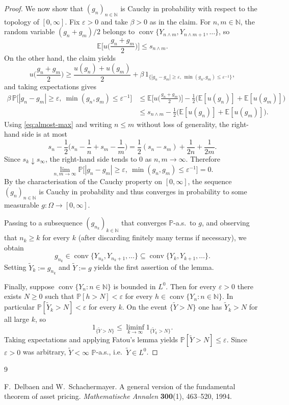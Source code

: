 \documentclass[11pt,a4paper]{report}
\numberwithin{equation}{chapter}
\theoremstyle{plain}
\theoremstyle{definition}
\newcommand{\E}{\mathbb{E}}
\newcommand{\PP}{\mathbb{P}}
\newcommand{\N}{\mathbb{N}}
\begin{document}
\begin{proof}
    We now show that $(g_n)_{n\in\N}$ is Cauchy in probability with respect to the topology of $[0,\infty]$. Fix $\varepsilon>0$ and take $\beta>0$ as in the claim. For $n,m\in\N$, the random variable $(g_n+g_m)/2$ belongs to $\operatorname{conv}\{Y_{n\wedge m},Y_{n\wedge m+1},\dots\}$, so
    \[
        \E\Big[u\Big(\frac{g_n+g_m}2\Big)\Big]\le s_{n\wedge m}.
    \]
    On the other hand, the claim yields
    \[
        u\Big(\frac{g_n+g_m}2\Big)\ge\frac{u(g_n)+u(g_m)}2+\beta\,1_{\{|g_n-g_m|\ge\varepsilon,\,\min(g_n,g_m)\le\varepsilon^{-1}\}},
    \]
    and taking expectations gives
    \begin{align*}
        \beta\,\PP\big[|g_n-g_m|\ge\varepsilon,\ \min(g_n,g_m)\le\varepsilon^{-1}\big]
         & \le\E\Big[u\Big(\frac{g_n+g_m}2\Big)\Big]-\frac12\big(\E[u(g_n)]+\E[u(g_m)]\big) \\
         & \le s_{n\wedge m}-\frac12\big(\E[u(g_n)]+\E[u(g_m)]\big).
    \end{align*}
    Using \eqref{eq:almost-max} and writing $n\le m$ without loss of generality, the right-hand side is at most
    \[
        s_n-\frac12\Big(s_n-\frac1n+s_m-\frac1m\Big)=\frac12(s_n-s_m)+\frac1{2n}+\frac1{2m}.
    \]
    Since $s_k\downarrow s_\infty$, the right-hand side tends to $0$ as $n,m\to\infty$. Therefore
    \[
        \lim_{n,m\to\infty}\PP\big[|g_n-g_m|\ge\varepsilon,\ \min(g_n,g_m)\le\varepsilon^{-1}\big]=0.
    \]
    By the characterisation of the Cauchy property on $[0,\infty]$, the sequence $(g_n)_{n\in\N}$ is Cauchy in probability and thus converges in probability to some measurable $g\colon\Omega\to[0,\infty]$.

    Passing to a subsequence $(g_{n_k})_{k\in\N}$ that converges $\PP$-a.s.\ to $g$, and observing that $n_k\ge k$ for every $k$ (after discarding finitely many terms if necessary), we obtain
    \[
        g_{n_k}\in\operatorname{conv}\{Y_{n_k},Y_{n_k+1},\dots\}\subseteq\operatorname{conv}\{Y_k,Y_{k+1},\dots\}.
    \]
    Setting $\widetilde Y_k:=g_{n_k}$ and $\widetilde Y:=g$ yields the first assertion of the lemma.

    Finally, suppose $\operatorname{conv}\{Y_n:n\in\N\}$ is bounded in $L^0$. Then for every $\varepsilon>0$ there exists $N\ge0$ such that $\PP[h>N]<\varepsilon$ for every $h\in\operatorname{conv}\{Y_n:n\in\N\}$. In particular $\PP[\widetilde Y_k>N]<\varepsilon$ for every $k$. On the event $\{\widetilde Y>N\}$ one has $\widetilde Y_k>N$ for all large $k$, so
    \[
        1_{\{\widetilde Y>N\}}\le\liminf_{k\to\infty}1_{\{\widetilde Y_k>N\}}.
    \]
    Taking expectations and applying Fatou's lemma yields $\PP[\widetilde Y>N]\le\varepsilon$. Since $\varepsilon>0$ was arbitrary, $\widetilde Y<\infty$ $\PP$-a.s., i.e.\ $\widetilde Y\in L^0$.
\end{proof}

\begin{thebibliography}{9}

    F.~Delbaen and W.~Schachermayer.
    A general version of the fundamental theorem of asset pricing.
    \emph{Mathematische Annalen} \textbf{300}(1), 463--520, 1994.

\end{thebibliography}
\end{document}
